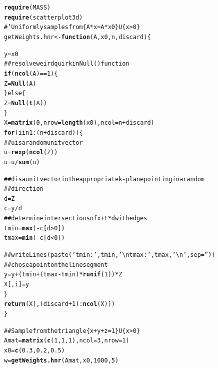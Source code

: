 \documentclass{article}\usepackage{graphicx, color}
\makeatletter
\newcommand{\hlfunctioncall}[1]{\textcolor[rgb]{0.501960784313725,0,0.329411764705882}{\textbf{#1}}}%
\newcommand{\hlcomment}[1]{\textcolor[rgb]{0.180392156862745,0.6,0.341176470588235}{#1}}%
\newenvironment{kframe}{%
 \def\at@end@of@kframe{}%
 \ifinner\ifhmode%
  \def\at@end@of@kframe{\end{minipage}}%
  \begin{minipage}{\columnwidth}%
 \fi\fi%
 \def\FrameCommand##1{\hskip\@totalleftmargin \hskip-\fboxsep
 \colorbox{shadecolor}{##1}\hskip-\fboxsep
     \hskip-\linewidth \hskip-\@totalleftmargin \hskip\columnwidth}%
 \MakeFramed {\advance\hsize-\width
   \@totalleftmargin\z@ \linewidth\hsize
   \@setminipage}}%
 {\par\unskip\endMakeFramed%
 \at@end@of@kframe}
\newenvironment{knitrout}{}{} %
\makeatother
\begin{document}
\begin{knitrout}
\color{fgcolor}\begin{kframe}
\begin{alltt}
\hlfunctioncall{require}(MASS)
\hlfunctioncall{require}(scatterplot3d)
\hlcomment{#' Uniformly samples from \{A*x=A*x0\} U \{x>0\}}
getWeights.hnr <- \hlfunctioncall{function}(A, x0, n, discard) \{
    
    y = x0
\hlcomment{    ## resolve weird quirk in Null() function}
    \hlfunctioncall{if} (\hlfunctioncall{ncol}(A) == 1) \{
        Z = \hlfunctioncall{Null}(A)
    \} else \{
        Z = \hlfunctioncall{Null}(\hlfunctioncall{t}(A))
    \}
    X = \hlfunctioncall{matrix}(0, nrow = \hlfunctioncall{length}(x0), ncol = n + discard)
    \hlfunctioncall{for} (i in 1:(n + discard)) \{
\hlcomment{        ## u is a random unit vector}
        u = \hlfunctioncall{rexp}(\hlfunctioncall{ncol}(Z))
        u = u/\hlfunctioncall{sum}(u)
        
\hlcomment{        ## d is a unit vector in the appropriate k-plane pointing in a random}
\hlcomment{        ## direction}
        d = Z %
        c = y/d
\hlcomment{        ## determine intersections of x + t*d with edges}
        tmin = \hlfunctioncall{max}(-c[d > 0])
        tmax = \hlfunctioncall{min}(-c[d < 0])
        
\hlcomment{        ## writeLines(paste('tmin: ', tmin, '\textbackslash{}ntmax: ', tmax, '\textbackslash{}n', sep = ''))}
\hlcomment{        ## chose a point on the line segment}
        y = y + (tmin + (tmax - tmin) * \hlfunctioncall{runif}(1)) * Z %
        X[, i] = y
    \}
    \hlfunctioncall{return}(X[, (discard + 1):\hlfunctioncall{ncol}(X)])
\}


\hlcomment{## Sample from the triangle \{x+y+z =1\} U \{x>0\}}
Amat = \hlfunctioncall{matrix}(\hlfunctioncall{c}(1, 1, 1), ncol = 3, nrow = 1)
x0 = \hlfunctioncall{c}(0.3, 0.2, 0.5)
w = \hlfunctioncall{getWeights.hnr}(Amat, x0, 1000, 5)


\end{alltt}
\end{kframe}
\end{knitrout}
\end{document}
